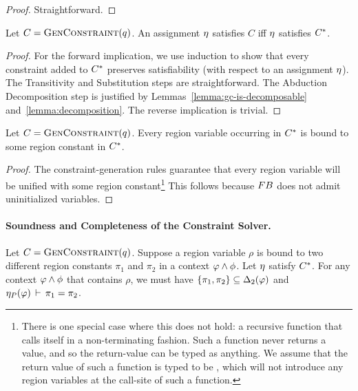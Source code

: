 \begin{proof}
  Straightforward.
\end{proof}

\begin{theorem}
  \label{thm:closure}
Let $C = \textsc{GenConstraint}(q)$.
An assignment $\eta$ satisfies $C$ iff $\eta$ satisfies ${C}^*$.
\end{theorem}

\begin{proof}
  For the forward implication, we use induction to show that every constraint
  added to ${C}^*$ preserves satisfiability (with respect to an assignment $\eta$).
  The Transitivity and Substitution steps are straightforward. The Abduction Decomposition
  step is justified by Lemmas~\ref{lemma:gc-is-decomposable} and~\ref{lemma:decomposition}.
  The reverse implication is trivial.
\end{proof}

\begin{lemma}
  \label{lemma:completely-bound}
Let $C = \textsc{GenConstraint}(q)$.
Every region variable occurring in ${C}^*$ is bound to some region constant in ${C}^*$.
\end{lemma}

\begin{proof}
The constraint-generation rules guarantee that every region variable will
be unified with some region constant\footnote{
There is one special case where this does not hold: a recursive function
that calls itself in a non-terminating fashion. Such a function never
returns a value, and so the return-value can be typed as anything.
We assume that the return value of such a function is typed to be ,
which will not introduce any region variables at the call-site of such a function.}
This follows because ${\sc FB}$ does not admit uninitialized variables.
\end{proof}

\paragraph{Soundness and Completeness of the Constraint Solver.}
\begin{lemma}
Let $C = \textsc{GenConstraint}(q)$.
Suppose a region variable $\rho$ is bound to two different region constants $\pi_1$
and $\pi_2$ in a context $\varphi \wedge \phi$. %
Let $\eta$ satisfy ${C}^*$.
For any context $\varphi \wedge \phi$ that contains $\rho$, we must have
$\{ \pi_1, \pi_2 \} \subseteq {\Delta_2}(\varphi)$ and
$\eta_P(\varphi)\,\vdash\,\pi_1 = \pi_2$.
\end{lemma}


